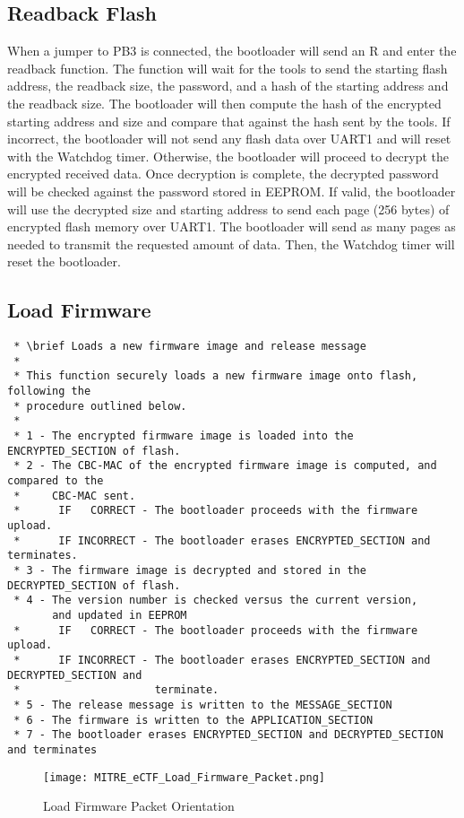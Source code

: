 \documentclass[11pt]{article}
\begin{document}
\subsection{Readback Flash}
When a jumper to PB3 is connected, the bootloader will send an R and enter the readback function.  The function will wait for the tools to send the starting flash address, the readback size, the password, and a hash of the starting address and the readback size.  The bootloader will then compute the hash of the encrypted starting address and size and compare that against the hash sent by the tools.  If incorrect, the bootloader will not send any flash data over UART1 and will reset with the Watchdog timer. Otherwise, the bootloader will proceed to decrypt the encrypted received data.  Once decryption is complete, the decrypted password will be checked against the password stored in EEPROM.  If valid, the bootloader will use the decrypted size and starting address to send each page (256 bytes) of encrypted flash memory over UART1.  The bootloader will send as many pages as needed to transmit the requested amount of data.  Then, the Watchdog timer will reset the bootloader. 
\subsection{Load Firmware}
\begin{verbatim}
 * \brief Loads a new firmware image and release message
 * 
 * This function securely loads a new firmware image onto flash, following the
 * procedure outlined below.
 * 
 * 1 - The encrypted firmware image is loaded into the ENCRYPTED_SECTION of flash.
 * 2 - The CBC-MAC of the encrypted firmware image is computed, and compared to the
 *	   CBC-MAC sent.
 *		IF   CORRECT - The bootloader proceeds with the firmware upload.
 *		IF INCORRECT - The bootloader erases ENCRYPTED_SECTION and terminates.
 * 3 - The firmware image is decrypted and stored in the DECRYPTED_SECTION of flash.
 * 4 - The version number is checked versus the current version,
	   and updated in EEPROM
 *		IF   CORRECT - The bootloader proceeds with the firmware upload.
 *		IF INCORRECT - The bootloader erases ENCRYPTED_SECTION and DECRYPTED_SECTION and
 *					   terminate.
 * 5 - The release message is written to the MESSAGE_SECTION
 * 6 - The firmware is written to the APPLICATION_SECTION
 * 7 - The bootloader erases ENCRYPTED_SECTION and DECRYPTED_SECTION and terminates
\end{verbatim}
\begin{figure}[!h]
\begin{center}
\texttt{[image: MITRE\_eCTF\_Load\_Firmware\_Packet.png]}
\caption{Load Firmware Packet Orientation}
\end{center}
\end{figure}
\end{document}
